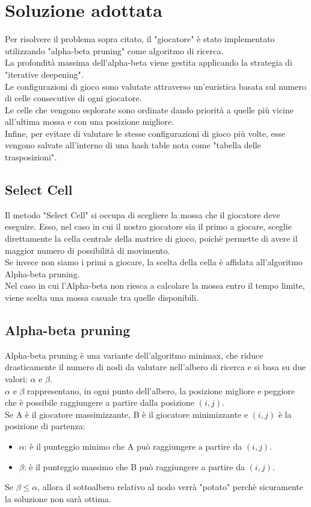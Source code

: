 \section{Soluzione adottata}
Per risolvere il problema sopra citato, il "giocatore" è stato implementato utilizzando "alpha-beta pruning" come algoritmo di ricerca.\\
La profondità massima dell'alpha-beta viene gestita applicando la strategia di "iterative deepening".\\
Le configurazioni di gioco sono valutate attraverso un'euristica basata sul numero di celle consecutive di ogni giocatore.\\
Le celle che vengono esplorate sono ordinate dando priorità a quelle più vicine all'ultima mossa e con una posizione migliore.\\
Infine, per evitare di valutare le stesse configurazioni di gioco più volte, esse vengono salvate all'interno di una hash table nota come "tabella delle trasposizioni".

\subsection{Select Cell}
Il metodo "Select Cell" si occupa di scegliere la mossa che il giocatore deve eseguire. Esso, nel caso in cui il nostro giocatore sia il primo a giocare, sceglie direttamente la cella centrale della matrice di gioco, poichè permette di avere il maggior numero di possibilità di movimento.\\
Se invece non siamo i primi a giocare, la scelta della cella è affidata all'algoritmo Alpha-beta pruning.\\
Nel caso in cui l'Alpha-beta non riesca a calcolare la mossa entro il tempo limite, viene scelta una mossa casuale tra quelle disponibili.

\subsection{Alpha-beta pruning}
Alpha-beta pruning è una variante dell'algoritmo minimax, che riduce drasticamente il numero di nodi da valutare nell'albero di ricerca e si basa su due valori: $ \alpha $ e $ \beta $.\\
$ \alpha $ e $ \beta $ rappresentano, in ogni punto dell'albero, la posizione migliore e peggiore che è possibile raggiungere a partire dalla posizione $ (i, j) $.\\
Se A è il giocatore massimizzante, B è il giocatore minimizzante e $ (i, j) $ è la posizione di partenza:
\begin{itemize}
    \item $ \alpha $: è il punteggio minimo che A può raggiungere a partire da $ (i, j) $.
    \item $ \beta $: è il punteggio massimo che B può raggiungere a partire da $ (i, j) $.
\end{itemize}
Se $ \beta \leq \alpha $, allora il sottoalbero relativo al nodo verrà "potato" perchè sicuramente la soluzione non sarà ottima.
